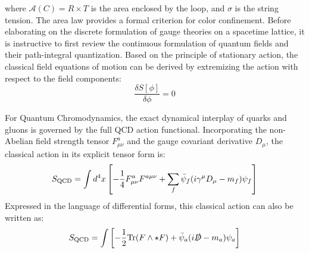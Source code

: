 where $\mathcal{A}(C) = R \times T$ is the area enclosed by the loop, and $\sigma$ is the string tension. The area law provides a formal criterion for color confinement. Before elaborating on the discrete formulation of gauge theories on a spacetime lattice, it is instructive to first review the continuous formulation of quantum fields and their path-integral quantization. Based on the principle of stationary action, the classical field equations of motion can be derived by extremizing the action with respect to the field components:
\begin{equation}
\frac{\delta S[\phi]}{\delta \phi} = 0
\end{equation}

For Quantum Chromodynamics, the exact dynamical interplay of quarks and gluons is governed by the full QCD action functional. Incorporating the non-Abelian field strength tensor $F_{\mu\nu}^a$ and the gauge covariant derivative $D_\mu$, the classical action in its explicit tensor form is:
\begin{equation}
S_{\rm QCD} = \int d^4x \left[ -\frac{1}{4} F_{\mu\nu}^a F^{a \mu\nu} + \sum_{f} \bar{\psi}_{f} (i \gamma^\mu D_\mu - m_f) \psi_{f} \right]
\end{equation}
Expressed in the language of differential forms, this classical action can also be written as:
\begin{equation}
S_{\rm QCD} = \int \left[ - \frac{1}{2} \mathrm{Tr} (F \wedge \star F) + \bar \psi_a (i \slashed{D} - m_a) \psi_a \right]
\end{equation}


